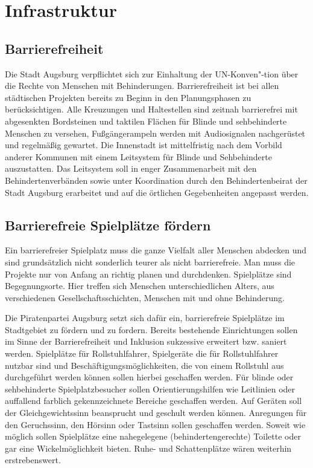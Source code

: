 \chapter{Infrastruktur}

  \section{Barrierefreiheit}
  
  Die Stadt Augsburg verpflichtet sich zur Einhaltung der UN-Konven"-tion über 
  die Rechte von Menschen mit Behinderungen. Barrierefreiheit ist bei allen 
  städtischen Projekten bereits zu Beginn in den Planungsphasen zu 
  berücksichtigen. Alle Kreuzungen und Haltestellen sind zeitnah barrierefrei 
  mit abgesenkten Bordsteinen und taktilen Flächen für Blinde und 
  sehbehinderte Menschen zu versehen, Fußgängerampeln werden mit Audiosignalen 
  nachgerüstet und regelmäßig gewartet. Die Innenstadt ist mittelfristig nach 
  dem Vorbild anderer Kommunen mit einem Leitsystem für Blinde und 
  Sehbehinderte auszustatten. Das Leitsystem soll in enger Zusammenarbeit mit 
  den Behindertenverbänden sowie unter Koordination durch den 
  Behindertenbeirat der Stadt Augsburg erarbeitet und auf die örtlichen 
  Gegebenheiten angepasst werden.
  
  \section{Barrierefreie Spielplätze fördern}
  
  Ein barrierefreier Spielplatz muss die ganze Vielfalt aller Menschen 
  abdecken und sind grundsätzlich nicht sonderlich teurer als nicht 
  barrierefreie. Man muss die Projekte nur von Anfang an richtig planen und 
  durchdenken. Spielplätze sind Begegnungsorte. Hier treffen sich Menschen 
  unterschiedlichen Alters, aus verschiedenen Gesellschaftsschichten, Menschen 
  mit und ohne Behinderung.
    
  Die Piratenpartei Augsburg setzt sich dafür ein, barrierefreie Spielplätze 
  im Stadtgebiet zu fördern und zu fordern. Bereits bestehende Einrichtungen 
  sollen im Sinne der Barrierefreiheit und Inklusion sukzessive erweitert bzw. 
  saniert werden. Spielplätze für Rollstuhlfahrer, Spielgeräte die für 
  Rollstuhlfahrer nutzbar sind und Beschäftigungsmöglichkeiten, die von einem 
  Rollstuhl aus durchgeführt werden können sollen hierbei geschaffen werden. 
  Für blinde oder sehbehinderte Spielplatzbesucher sollen Orientierungshilfen 
  wie Leitlinien oder auffallend farblich gekennzeichnete Bereiche geschaffen 
  werden. Auf Geräten soll der Gleichgewichtssinn beansprucht und geschult 
  werden können. Anregungen für den Geruchssinn, den Hörsinn oder Tastsinn 
  sollen geschaffen werden. Soweit wie möglich sollen Spielplätze eine 
  nahegelegene (behindertengerechte) Toilette oder gar eine Wickelmöglichkeit 
  bieten. Ruhe- und Schattenplätze wären weiterhin erstrebenswert.
  
